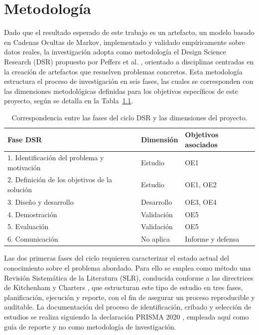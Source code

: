 \chapter{Metodología}

Dado que el resultado esperado de este trabajo es un artefacto, un modelo basado en Cadenas Ocultas de Markov, implementado y validado empíricamente sobre datos reales, la investigación adopta como metodología el Design Science Research (DSR) propuesto por Peffers et al. \parencite{peffers2007dsrm}, orientado a disciplinas centradas en la creación de artefactos que resuelven problemas concretos. Esta metodología estructura el proceso de investigación en seis fases, las cuales se corresponden con las dimensiones metodológicas definidas para los objetivos específicos de este proyecto, según se detalla en la Tabla~\ref{tab:dsr}.

\begin{table}[h!]
\centering
\small
\caption{Correspondencia entre las fases del ciclo DSR y las dimensiones del proyecto.}
\label{tab:dsr}
\begin{tabular}{p{7.2cm} p{3cm} p{4.4cm}}
\hline
\textbf{Fase DSR} & \textbf{Dimensión} & \textbf{Objetivos asociados} \\
\hline
1. Identificación del problema y motivación & Estudio & OE1 \\
2. Definición de los objetivos de la solución & Estudio & OE1, OE2 \\
3. Diseño y desarrollo & Desarrollo & OE3, OE4 \\
4. Demostración & Validación & OE5 \\
5. Evaluación & Validación & OE5 \\
6. Comunicación & No aplica & Informe y defensa \\
\hline
\end{tabular}
\end{table}
\FloatBarrier

Las dos primeras fases del ciclo requieren caracterizar el estado actual del conocimiento sobre el problema abordado. Para ello se emplea como método una Revisión Sistemática de la Literatura (SLR), conducida conforme a las directrices de Kitchenham y Charters \parencite{kitchenham2007guidelines}, que estructuran este tipo de estudio en tres fases, planificación, ejecución y reporte, con el fin de asegurar un proceso reproducible y auditable. La documentación del proceso de identificación, cribado y selección de estudios se realiza siguiendo la declaración PRISMA 2020 \parencite{page2021prisma}, empleada aquí como guía de reporte y no como metodología de investigación.

